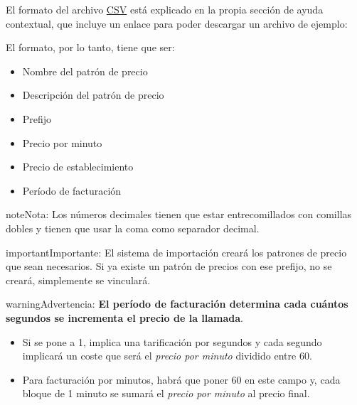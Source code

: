 \documentclass[letterpaper,10pt,spanish]{sphinxmanual}
\begin{document}
El formato del archivo \href{https://es.wikipedia.org/wiki/CSV}{CSV} está explicado en la propia sección de ayuda contextual, que incluye un enlace para poder descargar un archivo de ejemplo:

\noindent{}

El formato, por lo tanto, tiene que ser:
\begin{itemize}
\item {} 
Nombre del patrón de precio

\item {} 
Descripción del patrón de precio

\item {} 
Prefijo

\item {} 
Precio por minuto

\item {} 
Precio de establecimiento

\item {} 
Período de facturación

\end{itemize}

\begin{notice}{note}{Nota:}
Los números decimales tienen que estar entrecomillados con comillas dobles y tienen que usar la coma como separador decimal.
\end{notice}

\begin{notice}{important}{Importante:}
El sistema de importación creará los patrones de precio que sean necesarios. Si ya existe un patrón de precios con ese prefijo, no se creará, simplemente se vinculará.
\end{notice}

\begin{notice}{warning}{Advertencia:}
\textbf{El período de facturación determina cada cuántos segundos se incrementa el precio de la llamada}.
\begin{itemize}
\item {} 
Si se pone a 1, implica una tarificación por segundos y cada segundo implicará un coste que será el \emph{precio por minuto} dividido entre 60.

\item {} 
Para facturación por minutos, habrá que poner 60 en este campo y, cada bloque de 1 minuto se sumará el \emph{precio por minuto} al precio final.

\end{itemize}
\end{notice}
\end{document}
